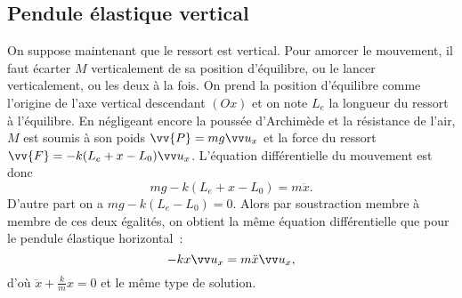 \subsection{Pendule élastique vertical}
\label{chap3-subsec:pendulevertical}
On suppose maintenant que le ressort est vertical. Pour amorcer le mouvement, il faut écarter $M$ verticalement de sa position d'équilibre, ou le lancer verticalement, ou les deux à la fois. On prend la position d'équilibre comme l'origine de l'axe vertical descendant $(Ox)$ et on note $L_e$ la longueur du ressort à l'équilibre. En négligeant encore la poussée d'Archimède et la résistance de l'air, $M$ est soumis à son poids $\vv{P}=mg\ux$ et la force du ressort $\vv{F}=-k(L_e +x-L_0)\ux$. L'équation différentielle du mouvement est donc
\begin{equation}
  mg -k(L_e +x-L_0) = m\ddot{x}.
\end{equation}
D'autre part on a $ mg-k(L_e-L_0)=0$. Alors par soustraction membre à membre de ces deux égalités, on obtient la même équation différentielle que pour le pendule élastique horizontal~:
\begin{equation}
  -kx \ux = m \ddot{x} \ux,
\end{equation}
d'où $\ddot{x} +\frac{k}{m}x=0$ et le même type de solution.

